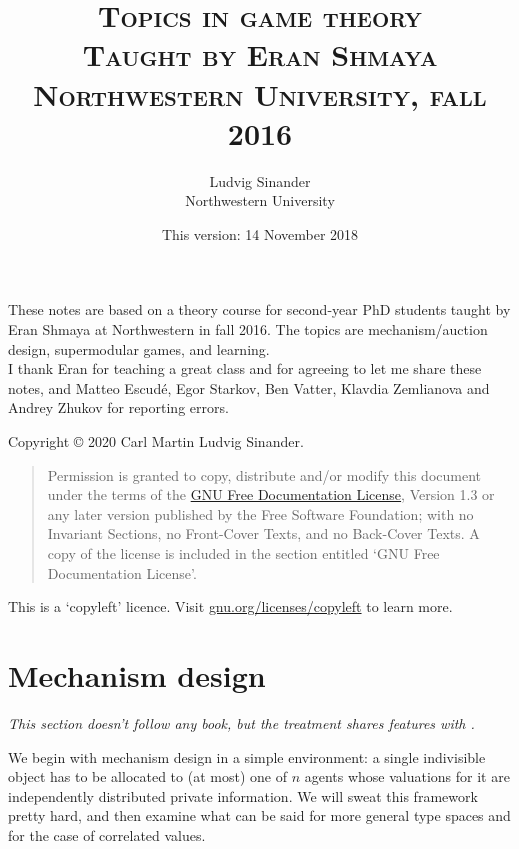 \documentclass[11pt,letterpaper,reqno,oneside]{article}
\title{\scshape Topics in game theory \\
	\vspace{0.5em}
	\large \scshape Taught by Eran Shmaya \\
	\large \scshape Northwestern University, fall 2016
	}
\author{Ludvig Sinander \\ Northwestern University}
\date{\small This version: 14 November 2018}
\begin{document}
\maketitle


\noindent
These notes are based on a theory course for second-year PhD students taught by Eran Shmaya at Northwestern in fall 2016. The topics are mechanism/auction design, supermodular games, and learning.\\

\noindent
I thank Eran for teaching a great class and for agreeing to let me share these notes, and Matteo Escudé, Egor Starkov, Ben Vatter, Klavdia Zemlianova and Andrey Zhukov for reporting errors.



\pagebreak
\hspace{1pt}\vfill
\noindent
Copyright \copyright{} 2020 Carl Martin Ludvig Sinander.

\begin{quotation}
\noindent
Permission is granted to copy, distribute and/or modify this document under the terms of the \href{https://www.gnu.org/licenses/fdl}{GNU Free Documentation License}, Version 1.3 or any later version published by the Free Software Foundation; with no Invariant Sections, no Front-Cover Texts, and no Back-Cover Texts. A copy of the license is included in the section entitled `GNU
Free Documentation License'.
\end{quotation}

\noindent
This is a `copyleft' licence.
Visit \href{https://www.gnu.org/licenses/copyleft}{gnu.org/licenses/copyleft} to learn more.



\pagebreak
{}
\tableofcontents
{}



\pagebreak
\section{Mechanism design}
\label{sec:mech_desi}

\emph{This section doesn't follow any book, but the treatment shares features with \textcite{Vohra2011}.}

We begin with mechanism design in a simple environment: a single indivisible object has to be allocated to (at most) one of $n$ agents whose valuations for it are independently distributed private information. We will sweat this framework pretty hard, and then examine what can be said for more general type spaces and for the case of correlated values.
\end{document}
